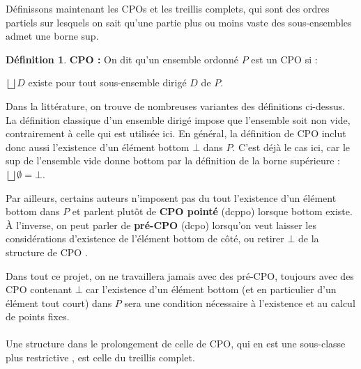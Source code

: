 \documentclass{article}
\newcommand{\yz}[1]{\textcolor{blue}{{[YZ:~#1]}}}
\theoremstyle{definition}
\newtheorem{definition}{Définition}[section]
\begin{document}
Définissons maintenant les CPOs et les treillis complets, qui sont des ordres partiels sur lesquels on sait qu'une partie plus ou moins vaste des sous-ensembles admet une borne sup.

\begin{definition}{\textbf{CPO :}}
On dit qu'un ensemble ordonné $P$ est un CPO si :


$\bigsqcup D$ existe pour tout sous-ensemble dirigé $D$ de $P$.
\end{definition}

Dans la littérature, on trouve de nombreuses variantes des définitions
ci-dessus. La définition classique d'un ensemble dirigé impose que l'ensemble soit non vide, contrairement à celle qui est utilisée ici. En général, la définition de CPO inclut donc aussi l'existence d'un élément bottom $\bot$ dans $P$. %
C'est déjà le cas ici, car le sup de l'ensemble vide donne bottom par la définition de la borne supérieure : ~ $\bigsqcup \emptyset = \bot$.


Par ailleurs, certains auteurs n'imposent pas du tout l'existence d'un élément bottom dans $P$ et parlent plutôt de \textbf{CPO pointé} (\og dcppo\fg{}) lorsque bottom existe. À l'inverse, on peut parler de \textbf{pré-CPO} (dcpo) lorsqu'on veut laisser les considérations d'existence de l'élément bottom de côté, ou retirer $\bot$ de la structure de CPO \cite[page 175]{main}.

Dans tout ce projet, on ne travaillera jamais avec des pré-CPO, toujours avec des CPO contenant $\bot$ car l'existence d'un élément bottom (et en particulier d'un élément tout court) dans $P$ sera une condition nécessaire à l'existence et au calcul de points fixes.

\paragraph{}

Une structure dans le prolongement de celle de CPO, qui en est une sous-classe plus restrictive %
, est celle du treillis complet.
\end{document}
